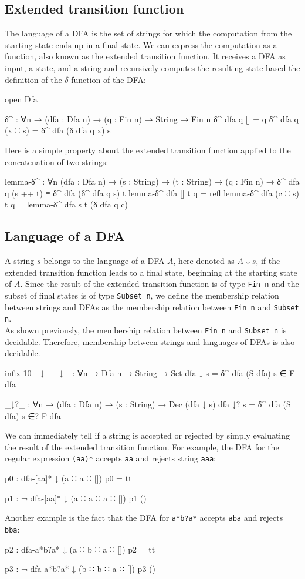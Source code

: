 \subsection{Extended transition function}
The language of a DFA is the set of strings for which the computation from the starting state ends up in a final state. We can express the computation as a function, also known as the extended transition function. It receives a DFA as input, a state, and a string and recursively computes the resulting state based the definition of the $\delta$ function of the DFA:
\begin{agda}
open Dfa

δ^ : ∀{n} → (dfa : Dfa n) → (q : Fin n) → String → Fin n
δ^ dfa q [] = q
δ^ dfa q (x ∷ s) = δ^ dfa (δ dfa q x) s
\end{agda}
Here is a simple property about the extended transition function applied to the concatenation of two strings:
\begin{agda}
lemma-δ^ : ∀{n}
  (dfa : Dfa n)
  → (s : String)
  → (t : String)
  → (q : Fin n)
  → δ^ dfa q (s ++ t) ≡ δ^ dfa (δ^ dfa q s) t
lemma-δ^ dfa [] t q = refl
lemma-δ^ dfa (c ∷ s) t q = lemma-δ^ dfa s t (δ dfa q c)
\end{agda}
\subsection{Language of a DFA}
A string $s$ belongs to the language of a DFA $A$, here denoted as $A ↓ s$, if the extended transition function leads to a final state, beginning at the starting state of $A$. Since the result of the extended transition function is of type \texttt{Fin n} and the subset of final states is of type \texttt{Subset n}, we define the membership relation between strings and DFAs as the membership relation between \texttt{Fin n} and \texttt{Subset n}.\\
As shown previously, the membership relation between \texttt{Fin n} and \texttt{Subset n} is decidable. Therefore, membership between strings and languages of DFAs is also decidable.
\begin{agda}
infix 10 _↓_
_↓_ : ∀{n} → Dfa n → String → Set
dfa ↓ s  = δ^ dfa (S dfa) s ∈ F dfa

_↓?_ : ∀{n} → (dfa : Dfa n) → (s : String) → Dec (dfa ↓ s)
dfa ↓? s = δ^ dfa (S dfa) s ∈? F dfa
\end{agda}
We can immediately tell if a string is accepted or rejected by simply evaluating the result of the extended transition function. For example, the DFA for the regular expression \texttt{(aa)*} accepts \texttt{aa} and rejects string \texttt{aaa}:
\begin{agda}
p0 : dfa-[aa]* ↓ (a ∷ a ∷ [])
p0 = tt

p1 : ¬ dfa-[aa]* ↓ (a ∷ a ∷ a ∷ [])
p1 ()
\end{agda}
Another example is the fact that the DFA for \texttt{a*b?a*} accepts \texttt{aba} and rejects \texttt{bba}:
\begin{agda}
p2 : dfa-a*b?a* ↓ (a ∷ b ∷ a ∷ [])
p2 = tt

p3 : ¬ dfa-a*b?a* ↓ (b ∷ b ∷ a ∷ [])
p3 ()
\end{agda}

